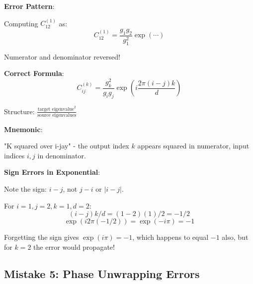 \begin{warning}
\textbf{Error Pattern}:

Computing $C_{12}^{(1)}$ as:
$$C_{12}^{(1)} = \frac{g_1 g_2}{g_1^2} \exp(\cdots)$$

Numerator and denominator reversed!

\textbf{Correct Formula}:
$$C_{ij}^{(k)} = \frac{g_k^2}{g_i g_j} \exp\left(i\frac{2\pi(i-j)k}{d}\right)$$

Structure: $\frac{\text{target eigenvalue}^2}{\text{source eigenvalues}}$

\textbf{Mnemonic}:

"K squared over i-jay" - the output index $k$ appears squared in numerator, input indices $i,j$ in denominator.

\textbf{Sign Errors in Exponential}:

Note the sign: $i-j$, not $j-i$ or $|i-j|$.

For $i=1, j=2, k=1, d=2$:
$$(i-j)k/d = (1-2)(1)/2 = -1/2$$
$$\exp(i2\pi(-1/2)) = \exp(-i\pi) = -1$$

Forgetting the sign gives $\exp(i\pi) = -1$, which happens to equal $-1$ also, but for $k=2$ the error would propagate!
\end{warning}

\subsection{Mistake 5: Phase Unwrapping Errors}

